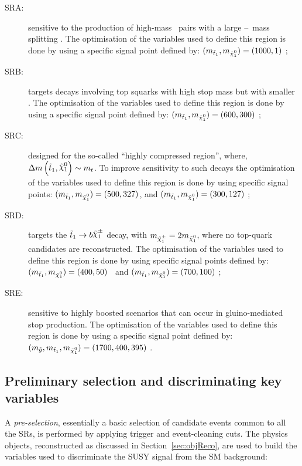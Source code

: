 		\begin{description}
			\item [SRA:] sensitive to the production of high-mass \stop\ pairs with a large \stop--\ninoone\ mass splitting \dmstopnino. The optimisation of the variables used to define this region is done by using a specific signal point defined by: $(\mstopone, \mninoone) = (1000,1)$ \GeV;
			
			\item [SRB:] targets decays involving top squarks with high stop mass but with smaller \dmstopnino. The optimisation of the variables used to define this region is done by using a specific signal point defined by: $(\mstopone, \mninoone) = (600, 300)$ \GeV;
			
			\item [SRC:] designed for the so-called ``highly compressed region'', where, $\dmstopnino \sim m_t$. To improve sensitivity to such decays the optimisation of the variables used to define this region is done by using specific signal points: $(\mstopone, \mninoone) = (500, 327)$, and $(\mstopone, \mninoone) = (300, 127)$ \GeV; 
			
			\item [SRD:] targets the $\stopone \to b \chinoonepm$ decay, with $\mchinoonepm = 2\mninoone$, where no top-quark candidates are reconstructed. The optimisation of the variables used to define this region is done by using specific signal points defined by: $(\mstopone, \mninoone) = (400,50)$ \GeV\ and $(\mstopone, \mninoone) = (700,100)$ \GeV; 
			
			\item [SRE:] sensitive to highly boosted scenarios that can occur in gluino-mediated stop production. The optimisation of the variables used to define this region is done by using a specific signal point defined by: $(\mgluino, \mstopone, \mninoone) = (1700, 400, 395)$ \GeV.
		\end{description}

		\subsection{Preliminary selection and discriminating key variables}
		\label{sec:vars_used}

			A \emph{pre-selection}, essentially a basic selection of candidate events common to all the \acp{SR}, is performed by applying trigger and event-cleaning cuts. The physics objects, reconstructed as discussed in Section~\ref{sec:objReco}, are used to build the variables used to discriminate the \ac{SUSY} signal from the \ac{SM} background:

